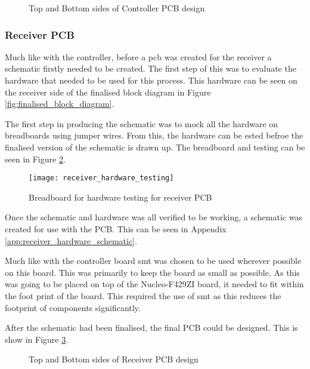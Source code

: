 \documentclass [11pt]{article}
\begin{document}
\begin{figure}[H]
\centering
{}
\caption{Top and Bottom sides of Controller PCB design}
\label{fig:finalised_PCB_design_controller}
\end{figure} 

\subsubsection{Receiver PCB}

Much like with the controller, before a \gls{pcb} was created for the receiver a schematic firstly needed to be created. The first step of this was to evaluate the hardware that needed to be used for this process. This hardware can be seen on the receiver side of the finalised block diagram in Figure \ref{fig:finalised_block_diagram}.

The first step in producing the schematic was to mock all the hardware on breadboards using jumper wires. From this, the hardware can be ested befroe the finalised version of the schematic is drawn up. The breadboard and testing can be seen in Figure \ref{fig:receiver_hardware_testing}.

\begin{figure}[H]
\centerline{\texttt{[image: receiver\_hardware\_testing]}}
\caption{Breadboard for hardware testing for receiver PCB}
\label{fig:receiver_hardware_testing}
\end{figure}

Once the schematic and hardware was all verified to be working, a schematic was created for use with the PCB. This can be seen in Appendix \ref{app:receiver_hardware_schematic}.

Much like with the controller board \gls{smt} was chosen to be used wherever possible on this board. This was primarily to keep the board as small as possible. As this was going to be placed on top of the Nucleo-F429ZI board, it needed to fit within the foot print of the board. This required the use of \gls{smt} as this reduces the footprint of components significantly. 

After the schematic had been finalised, the final PCB could be designed. This is show in Figure \ref{fig:finalised_PCB_design_receiver}.

\begin{figure}[H]
\centering
{}
\caption{Top and Bottom sides of Receiver PCB design}
\label{fig:finalised_PCB_design_receiver}
\end{figure} 
\end{document}

